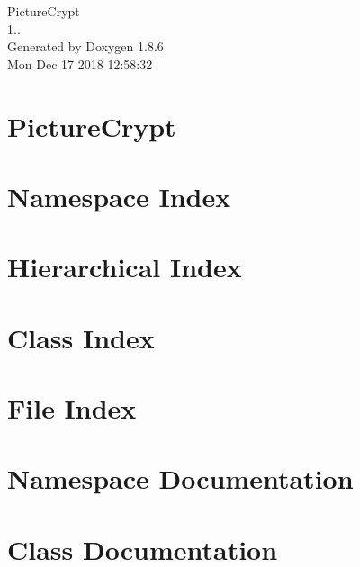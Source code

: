 \documentclass[twoside]{book}
\newcommand{\clearemptydoublepage}{%
  \newpage{\pagestyle{empty}\cleardoublepage}%
}
\begin{document}
\hypersetup{pageanchor=false}
\begin{titlepage}
\vspace*{7cm}
\begin{center}%
{\Large Picture\-Crypt \\[1ex]\large 1.. }\\
\vspace*{1cm}
{\large Generated by Doxygen 1.8.6}\\
\vspace*{0.5cm}
{\small Mon Dec 17 2018 12:58:32}\\
\end{center}
\end{titlepage}
\clearemptydoublepage
\tableofcontents
\clearemptydoublepage
{}
\hypersetup{pageanchor=true}

\chapter{Picture\-Crypt}
\label{index}\hypertarget{index}{}
\chapter{Namespace Index}

\chapter{Hierarchical Index}

\chapter{Class Index}

\chapter{File Index}

\chapter{Namespace Documentation}



\chapter{Class Documentation}







\end{document}

